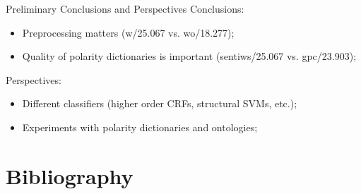 \documentclass{beamer}
\begin{document}
\begin{frame}{Preliminary Conclusions and Perspectives}
  Conclusions:
  \begin{itemize}
  \item Preprocessing matters (w/25.067 vs. wo/18.277);
  \item Quality of polarity dictionaries is important (sentiws/25.067 vs. gpc/23.903);
  \end{itemize}

  Perspectives:
  \begin{itemize}
  \item Different classifiers (higher order CRFs, structural SVMs, etc.);
  \item Experiments with polarity dictionaries and ontologies;
  \end{itemize}
\end{frame}

\section*{Bibliography}


\end{document}
